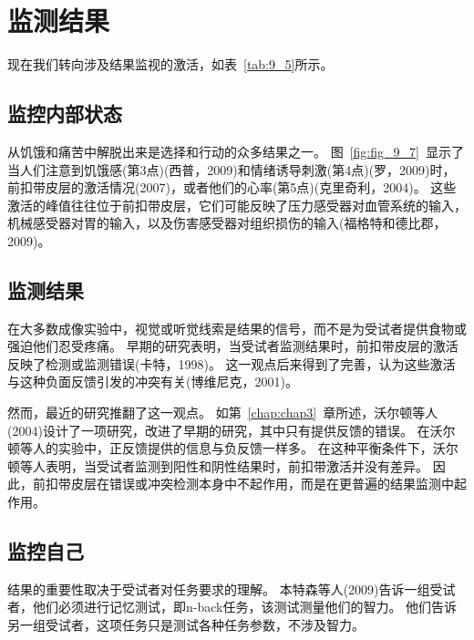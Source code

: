 \section{监测结果}
\par
现在我们转向涉及结果监视的激活，如表~\ref{tab:9_5}所示。


\subsection{监控内部状态}
\par

从饥饿和痛苦中解脱出来是选择和行动的众多结果之一。
图~\ref{fig:fig_9_7}~显示了当人们注意到饥饿感(第3点)(西普，2009)和情绪诱导刺激(第4点)(罗，2009)时，前扣带皮层的激活情况(2007)，或者他们的心率(第5点)(克里奇利，2004)。
这些激活的峰值往往位于前扣带皮层，它们可能反映了压力感受器对血管系统的输入，机械感受器对胃的输入，以及伤害感受器对组织损伤的输入(福格特和德比郡，2009)。
\par



\subsection{监测结果}
\par
在大多数成像实验中，视觉或听觉线索是结果的信号，而不是为受试者提供食物或强迫他们忍受疼痛。
早期的研究表明，当受试者监测结果时，前扣带皮层的激活反映了检测或监测错误(卡特，1998)。
这一观点后来得到了完善，认为这些激活与这种负面反馈引发的冲突有关(博维尼克，2001)。
\par


然而，最近的研究推翻了这一观点。
如第~\ref{chap:chap3}~章所述，沃尔顿等人(2004)设计了一项研究，改进了早期的研究，其中只有提供反馈的错误。
在沃尔顿等人的实验中，正反馈提供的信息与负反馈一样多。
在这种平衡条件下，沃尔顿等人表明，当受试者监测到阳性和阴性结果时，前扣带激活并没有差异。
因此，前扣带皮层在错误或冲突检测本身中不起作用，而是在更普遍的结果监测中起作用。
\par



\subsection{监控自己}
\par
结果的重要性取决于受试者对任务要求的理解。
本特森等人(2009)告诉一组受试者，他们必须进行记忆测试，即n-back任务，该测试测量他们的智力。
他们告诉另一组受试者，这项任务只是测试各种任务参数，不涉及智力。
\par



